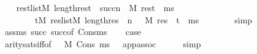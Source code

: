 \begin{isabellebody}
\ \ \isamarkupfalse%
\ {\isachardoublequoteopen}{\isacharparenleft}{\kern0pt}{\isasymforall}rest{\isasymin}list{\isacharparenleft}{\kern0pt}M{\isacharparenright}{\kern0pt}{\isachardot}{\kern0pt}\ length{\isacharparenleft}{\kern0pt}rest{\isacharparenright}{\kern0pt}\ {\isacharequal}{\kern0pt}\ succ{\isacharparenleft}{\kern0pt}n{\isacharparenright}{\kern0pt}\ {\isasymlongrightarrow}\ M{\isacharcomma}{\kern0pt}\ rest\ {\isacharat}{\kern0pt}\ ms\ {\isasymTurnstile}\ {\isasymphi}{\isacharparenright}{\kern0pt}\ {\isasymlongleftrightarrow}\isanewline
\ \ \ \ \ \ \ \ {\isacharparenleft}{\kern0pt}{\isasymforall}t{\isasymin}M{\isachardot}{\kern0pt}\ {\isasymforall}res{\isasymin}list{\isacharparenleft}{\kern0pt}M{\isacharparenright}{\kern0pt}{\isachardot}{\kern0pt}\ length{\isacharparenleft}{\kern0pt}res{\isacharparenright}{\kern0pt}\ {\isacharequal}{\kern0pt}\ n\ {\isasymlongrightarrow}\ \ M{\isacharcomma}{\kern0pt}\ {\isacharparenleft}{\kern0pt}res\ {\isacharat}{\kern0pt}\ {\isacharbrackleft}{\kern0pt}t{\isacharbrackright}{\kern0pt}{\isacharparenright}{\kern0pt}\ {\isacharat}{\kern0pt}\ ms\ {\isasymTurnstile}\ {\isasymphi}{\isacharparenright}{\kern0pt}{\isachardoublequoteclose}\isanewline
\ \ \ \ \isamarkupfalse%
\ simp\isanewline
\ \ \ \ \isamarkupfalse%
\ assms\ succ{\isacharparenleft}{\kern0pt}{}{\isacharcomma}{\kern0pt}{}{\isacharparenright}{\kern0pt}\ succ{\isacharparenleft}{\kern0pt}{}{\isacharparenright}{\kern0pt}{\isacharbrackleft}{\kern0pt}of\ {\isachardoublequoteopen}Cons{\isacharparenleft}{\kern0pt}{\isacharunderscore}{\kern0pt}{\isacharcomma}{\kern0pt}ms{\isacharparenright}{\kern0pt}{\isachardoublequoteclose}{\isacharbrackright}{\kern0pt}\isanewline
\ \ \isamarkupfalse%
\ {\isacharquery}{\kern0pt}case\isanewline
\ \ \ \ \isamarkupfalse%
\ arity{\isacharunderscore}{\kern0pt}sats{\isacharunderscore}{\kern0pt}iff{\isacharbrackleft}{\kern0pt}of\ {\isasymphi}\ {\isacharunderscore}{\kern0pt}\ M\ {\isachardoublequoteopen}Cons{\isacharparenleft}{\kern0pt}{\isacharunderscore}{\kern0pt}{\isacharcomma}{\kern0pt}\ ms\ {\isacharat}{\kern0pt}\ {\isacharunderscore}{\kern0pt}{\isacharparenright}{\kern0pt}{\isachardoublequoteclose}{\isacharbrackright}{\kern0pt}\ app{\isacharunderscore}{\kern0pt}assoc\isanewline
\ \ \ \ \isamarkupfalse%
\ {\isacharparenleft}{\kern0pt}simp{\isacharparenright}{\kern0pt}\isanewline
{}\isamarkupfalse%
%
\endisatagproof
{\isafoldproof}%
%
\isadelimproof
\isanewline
%
\endisadelimproof
\isanewline

\end{isabellebody}
